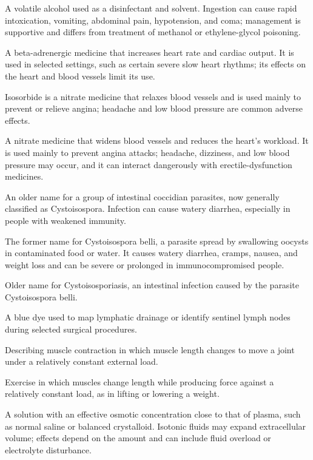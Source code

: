  A volatile alcohol used as a disinfectant and solvent. Ingestion can cause rapid intoxication, vomiting, abdominal pain, hypotension, and coma; management is supportive and differs from treatment of methanol or ethylene-glycol poisoning.

 A beta-adrenergic medicine that increases heart rate and cardiac output. It is used in selected settings, such as certain severe slow heart rhythms; its effects on the heart and blood vessels limit its use.

 Isosorbide is a nitrate medicine that relaxes blood vessels and is used mainly to prevent or relieve angina; headache and low blood pressure are common adverse effects.

 A nitrate medicine that widens blood vessels and reduces the heart’s workload. It is used mainly to prevent angina attacks; headache, dizziness, and low blood pressure may occur, and it can interact dangerously with erectile-dysfunction medicines.

 An older name for a group of intestinal coccidian parasites, now generally classified as Cystoisospora. Infection can cause watery diarrhea, especially in people with weakened immunity.

 The former name for Cystoisospora belli, a parasite spread by swallowing oocysts in contaminated food or water. It causes watery diarrhea, cramps, nausea, and weight loss and can be severe or prolonged in immunocompromised people.

 Older name for Cystoisosporiasis, an intestinal infection caused by the parasite Cystoisospora belli.

 A blue dye used to map lymphatic drainage or identify sentinel lymph nodes during selected surgical procedures.

 Describing muscle contraction in which muscle length changes to move a joint under a relatively constant external load.

 Exercise in which muscles change length while producing force against a relatively constant load, as in lifting or lowering a weight.

 A solution with an effective osmotic concentration close to that of plasma, such as normal saline or balanced crystalloid. Isotonic fluids may expand extracellular volume; effects depend on the amount and can include fluid overload or electrolyte disturbance.

